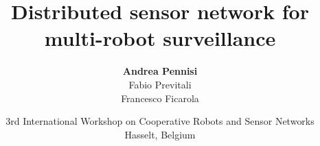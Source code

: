 \documentclass{beamer}
\title[Distributed sensor network for multi-robot surveillance]{\Large Distributed sensor network for multi-robot surveillance}
\subtitle{}
\author[Andrea Pennisi]{\Large\textbf{Andrea Pennisi}\\ Fabio Previtali\\ Francesco Ficarola}
\date[June 2-5, 2014]{\small 3rd International Workshop on Cooperative Robots and Sensor Networks\\Hasselt, Belgium}
\begin{document}
\begin{frame}[plain]
	\titlepage
\end{frame}



\tiny


\end{document}
